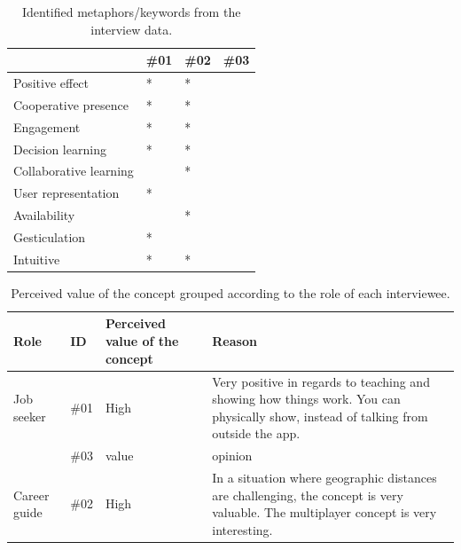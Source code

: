 \begin{table}[H]
\centering
\begin{tabular}{l|lll}
                        & \#01      & \#02     &\#03 \\ \hline 
Positive effect         & *          &*           &         \\ 
Cooperative presence    & *          & *         &          \\ 
Engagement              & *          & *          &          \\ 
Decision learning       & *          & *          &          \\ 
Collaborative learning  &            & *           &          \\ 
User representation     & *          &           &          \\ 
Availability            &            & *          &          \\ 
Gesticulation           & *          &           &          \\ 
Intuitive               & *          & *         &          \\


\end{tabular}
\caption{Identified metaphors/keywords from the interview data.}
\label{table:phase3MethaphorsAnalysis}
\end{table}


\begin{table}[H]
      \centering
        \begin{tabular}{llp{2.5cm}p{5cm}}
        \toprule
        Role & ID & Perceived value of the concept & Reason\\
        \midrule\vspace{0.2cm}
         Job seeker  & \#01 & High & Very positive in regards to teaching and showing how things work. You can physically show, instead of talking from outside the app.\\
         & \#03  & value & opinion
         \\\midrule
        Career guide & \#02  & High & In a situation where geographic distances are challenging, the concept is very valuable. The multiplayer concept is very interesting.\\
        \bottomrule
        \end{tabular}
        \caption{Perceived value of the concept grouped according to the role of each interviewee.}
        \label{table:phase3SatisfactionAnalysis}
\end{table}



